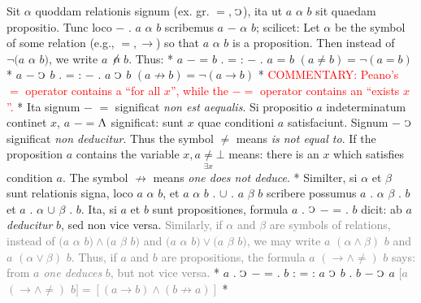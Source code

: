 \documentclass{book}
\newcommand{\C}{\mathop{\sbox0{$\displaystyle$$\reflectbox{C}$} %
\raisebox{-\height+\ht0-0.05cm}[\ht0][\dp0]{\scalebox{0.8}[0.8]{\copy0}}}\displaylimits} %
\newcommand{\abs}{\mathop{\rotatebox[origin=c]{180}{V}}}
\newcommand\irrelavent[1]{\textcolor{gray}{#1}}
\newcommand\commentary[1]{\textcolor{red}{COMMENTARY: #1}}
\newenvironment{translateTwoCol}
               { %
                 \columnratio{0.5, 0.5} \begin{paracol}{2}
                 \newcommand{\LAT}{\switchcolumn[0]*}
                 \newcommand{\ENG}{\switchcolumn[1]}
               }
               { %
                 \let\ENG\undefined
                 \let\LAT\undefined
                 \end{paracol}
               }
\begin{document}
\begin{translateTwoCol}
\quad Sit $\alpha$ quoddam relationis signum (ex. gr. $=$, $\C$), ita ut $a$ $\alpha$ $b$ sit quaedam propositio. Tunc loco $-$ . $a$ $\alpha$ $b$ scribemus $a$ $-$ $\alpha$ $b$; scilicet:
\ENG
\quad Let $\alpha$ be the symbol of some relation (e.g., $=, \rightarrow$) so that $a$ $\alpha$ $b$ is a proposition. Then instead of $\neg(a$ $\alpha$ $b)$, we write $a$ $\not\mathrel{\,\alpha\!}$ $b$. Thus:
\LAT
\hspace{1.06cm} $a$ $-$ = $b$ . = : $-$ . $a$ = $b$
\ENG
\hspace{1.06cm} $(a \not= b) = \neg (a=b)$
\LAT
\hspace{1.06cm} $a$ $-$ $\C$ $b$ . = : $-$ . $a$ $\C$ $b$
\ENG
\hspace{1.06cm} $ (a \not\rightarrow b) = \neg (a \rightarrow b)$
\LAT
\ENG
\commentary{Peano's $=$\scalebox{0.7}{$x$} operator contains a ``for all $x$'', while the $-=$\scalebox{0.7}{$x$} operator contains an ``exists $x$''.}
\LAT
\quad Ita signum $-$ $=$ significat \emph{non est aequalis}. Si propositio $a$ indeterminatum continet $x$, $a$ $-=$\scalebox{0.7}{$x$}\thinspace $\abs$ significat: sunt $x$ quae conditioni $a$ satisfaciunt. Signum $-$ $\C$ significat \emph{non deducitur}.
\ENG
Thus the symbol $\not=$ means \emph{is not equal to}. If the proposition $a$ contains the variable $x, a\underset{\exists x}\neq \bot$ means: there is an $x$ which satisfies condition $a$. The symbol $\not\rightarrow$ means \emph{one does not deduce}.
\LAT
\quad Similter, si $\alpha$ et $\beta$ sunt relationis signa, loco $a$ $\alpha$ $b$, et $a$ $\alpha$ $b$ . $\cup$ . $a$ $\beta$ $b$ scribere possumus $a$ . $\alpha$ $\beta$ . $b$ et $a$ . $\alpha$ $\cup$ $\beta$ . $b$. Ita, si $a$ et $b$ sunt propositiones, formula $a$ . $\C$ $-$ = . $b$ dicit: ab $a$ \emph{deducitur} $b$, sed non vice versa.
\ENG
\quad \irrelavent{Similarly, if $\alpha$ and $\beta$ are symbols of relations, instead of $(a$ $\alpha$ $b) \wedge (a$ $\beta$ $b)$ and $(a$ $\alpha$ $b) \vee (a$ $\beta$ $b)$, we may write $a$ $(\alpha \wedge \beta)$ $b$ and $a$ $(\alpha \vee \beta)$ $b$. Thus, if $a$ and $b$ are propositions, the formula $a$ $(\rightarrow \wedge \not=)$ $b$ says: from $a$ \emph{one deduces} $b$, but not vice versa.}
\LAT
\hspace{1.06cm} $a$ . $\C$ $-$ = . $b$ : = : $a$ $\C$ $b$ . $b$ $-$ $\C$ $a$
\ENG
\hspace{1.06cm} \irrelavent{ $[a$ $(\rightarrow \wedge \not=)$ $b] = [(a \rightarrow b) \wedge (b \not\rightarrow a)]$ }
\LAT

\end{translateTwoCol}
\end{document}
